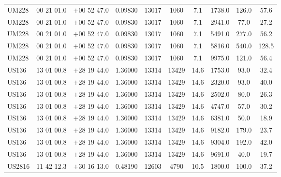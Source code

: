 \begin{landscape}
\begin{center}
\begin{longtable}{l c c c c c c c c c}
UM228  &                   00 21 01.0  &         $+$00 52 47.0  &       0.09830  & 13017  &   1060  &       7.1  &       1738.0  &  126.0  &  57.6  \\
UM228  &                   00 21 01.0  &         $+$00 52 47.0  &       0.09830  & 13017  &   1060  &       7.1  &       2941.0  &  77.0  &   27.2  \\
UM228  &                   00 21 01.0  &         $+$00 52 47.0  &       0.09830  & 13017  &   1060  &       7.1  &       5491.0  &  277.0  &  56.2  \\
UM228  &                   00 21 01.0  &         $+$00 52 47.0  &       0.09830  & 13017  &   1060  &       7.1  &       5816.0  &  540.0  &  128.5  \\
UM228  &                   00 21 01.0  &         $+$00 52 47.0  &       0.09830  & 13017  &   1060  &       7.1  &       9975.0  &  121.0  &  56.4  \\
US136  &                   13 01 00.8  &         $+$28 19 44.0  &       1.36000  & 13314  &   13429  &      14.6  &      1753.0  &  93.0  &   32.4  \\
US136  &                   13 01 00.8  &         $+$28 19 44.0  &       1.36000  & 13314  &   13429  &      14.6  &      2320.0  &  93.0  &   40.0  \\
US136  &                   13 01 00.8  &         $+$28 19 44.0  &       1.36000  & 13314  &   13429  &      14.6  &      2502.0  &  80.0  &   26.3  \\
US136  &                   13 01 00.8  &         $+$28 19 44.0  &       1.36000  & 13314  &   13429  &      14.6  &      4747.0  &  57.0  &   30.2  \\
US136  &                   13 01 00.8  &         $+$28 19 44.0  &       1.36000  & 13314  &   13429  &      14.6  &      6381.0  &  50.0  &   18.9  \\
US136  &                   13 01 00.8  &         $+$28 19 44.0  &       1.36000  & 13314  &   13429  &      14.6  &      9182.0  &  179.0  &  23.7  \\
US136  &                   13 01 00.8  &         $+$28 19 44.0  &       1.36000  & 13314  &   13429  &      14.6  &      9304.0  &  192.0  &  42.0  \\
US136  &                   13 01 00.8  &         $+$28 19 44.0  &       1.36000  & 13314  &   13429  &      14.6  &      9691.0  &  40.0  &   19.7  \\
US2816  &                  11 42 12.3  &         $+$30 16 13.0  &       0.48190  & 12603  &   4790  &       10.5  &      1800.0  &  100.0  &  37.2  \\

\end{longtable}
\end{center}
\end{landscape}
